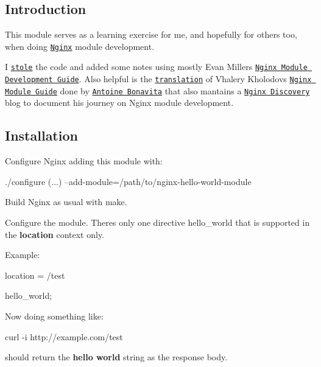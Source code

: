 \subsection*{Introduction}

This module serves as a learning exercise for me, and hopefully for others too, when doing \href{http://nginx.org}{\tt Nginx} module development.

I \href{http://dominicfallows.com/2011/02/20/hello-world-nginx-module-3/}{\tt stole} the code and added some notes using mostly Evan Miller\textquotesingle{}s \href{http://www.evanmiller.org/nginx-modules-guide.html}{\tt Nginx Module Development Guide}. Also helpful is the \href{http://antoine.bonavita.free.fr/nginx_mod_dev_en.html}{\tt translation} of Vhalery Kholodov\textquotesingle{}s \href{http://www.grid.net.ru/nginx/nginx-modules.html}{\tt Nginx Module Guide} done by \href{http://antoine.bonavita.free.fr/}{\tt Antoine Bonavita} that also mantains a \href{http://www.nginx-discovery.com/}{\tt Nginx Discovery} blog to document his journey on Nginx module development.

\subsection*{Installation}


\begin{DoxyEnumerate}
\item Configure Nginx adding this module with\+: \begin{DoxyVerb}./configure (...) --add-module=/path/to/nginx-hello-world-module
\end{DoxyVerb}

\item Build Nginx as usual with {\ttfamily make}.
\item Configure the module. There\textquotesingle{}s only one directive {\ttfamily hello\+\_\+world} that is supported in the {\bfseries location} context only.

Example\+: \begin{DoxyVerb}location = /test {

   hello_world;

}
\end{DoxyVerb}


Now doing something like\+: \begin{DoxyVerb}curl -i http://example.com/test
\end{DoxyVerb}


should return the {\bfseries hello world} string as the response body.
\end{DoxyEnumerate}

